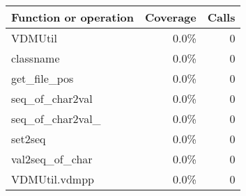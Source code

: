 \documentclass[a4paper]{article}
\begin{document}
\bigskip
\begin{longtable}{|l|r|r|}
\hline
Function or operation & Coverage & Calls \\
\hline
\hline
VDMUtil & 0.0\% & 0 \\
\hline
classname & 0.0\% & 0 \\
\hline
get\_file\_pos & 0.0\% & 0 \\
\hline
seq\_of\_char2val & 0.0\% & 0 \\
\hline
seq\_of\_char2val\_ & 0.0\% & 0 \\
\hline
set2seq & 0.0\% & 0 \\
\hline
val2seq\_of\_char & 0.0\% & 0 \\
\hline
\hline
VDMUtil.vdmpp & 0.0\% & 0 \\
\hline
\end{longtable}
\end{document}
